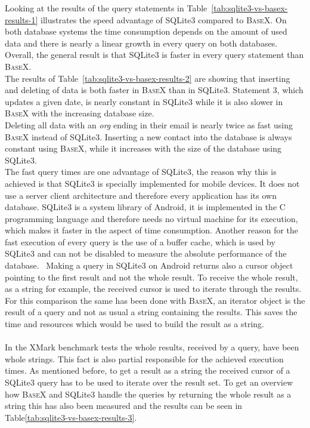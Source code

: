 Looking at the results of the query statements in Table~\ref{tab:sqlite3-vs-basex-results-1} illustrates the speed advantage of SQLite3 compared to \textsc{BaseX}.
On both database systems the time consumption depends on the amount of used data and there is nearly a linear growth in every query on both databases.
Overall, the general result is that SQLite3 is faster in every query statement than \textsc{BaseX}.\\
The results of Table~\ref{tab:sqlite3-vs-basex-results-2} are showing that inserting and deleting of data is both faster in \textsc{BaseX} than in SQLite3.
Statement 3, which updates a given date, is nearly constant in SQLite3 while it is also slower in \textsc{BaseX} with the increasing database size.\\
Deleting all data with an \textit{org} ending in their email is nearly twice as fast using \textsc{BaseX} instead of SQLite3.
Inserting a new contact into the database is always constant using \textsc{BaseX}, while it increases with the size of the database using SQLite3.\\
The fast query times are one advantage of SQLite3, the reason why this is achieved is that SQLite3 is specially implemented for mobile devices.
It does not use a server client architecture and therefore every application has its own database.\cite{wei2012android}
SQLite3 is a system library of Android, it is implemented in the C programming language and therefore needs no virtual machine for its execution, which makes it faster in the aspect of time consumption.
Another reason for the fast execution of every query is the use of a buffer cache, which is used by SQLite3 and can not be disabled to measure the absolute performance of the database.~\cite{kim2012androbench}
Making a query in SQLite3 on Android returns also a cursor object pointing to the first result and not the whole result. 
To receive the whole result, as a string for example, the received cursor is used to iterate through the results.
For this comparison the same has been done with \textsc{BaseX}, an iterator object is the result of a query and not as usual a string containing the results.
This saves the time and resources which would be used to build the result as a string.\\
\\
In the XMark benchmark tests the whole results, received by a query, have been whole strings.
This fact is also partial responsible for the achieved execution times.
As mentioned before, to get a result as a string the received cursor of a SQLite3 query has to be used to iterate over the result set.
To get an overview how \textsc{BaseX} and SQLite3 handle the queries by returning the whole result as a string this has also been measured and the results can be seen in Table\ref{tab:sqlite3-vs-basex-results-3}.

